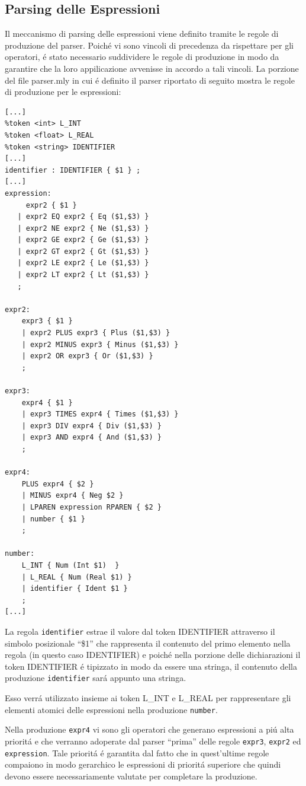 \documentclass[a4paper,10pt]{article}
\begin{document}
\subsection{Parsing delle Espressioni}
Il meccanismo di parsing delle espressioni viene definito tramite le regole di
produzione del parser. Poich\'e vi sono vincoli di precedenza da rispettare 
per gli operatori, \'e stato necessario suddividere le regole di produzione in
modo da garantire che la loro appilicazione avvenisse in accordo a tali
vincoli.
La porzione del file parser.mly in cui \'e definito il parser riportato di
 seguito mostra le regole di produzione per le espressioni:
\begin{verbatim}
[...]
%token <int> L_INT
%token <float> L_REAL
%token <string> IDENTIFIER
[...]
identifier : IDENTIFIER { $1 } ;
[...]
expression:
     expr2 { $1 }
   | expr2 EQ expr2 { Eq ($1,$3) }
   | expr2 NE expr2 { Ne ($1,$3) }
   | expr2 GE expr2 { Ge ($1,$3) }
   | expr2 GT expr2 { Gt ($1,$3) }
   | expr2 LE expr2 { Le ($1,$3) }
   | expr2 LT expr2 { Lt ($1,$3) }
   ;

expr2:
    expr3 { $1 }
    | expr2 PLUS expr3 { Plus ($1,$3) }
    | expr2 MINUS expr3 { Minus ($1,$3) }
    | expr2 OR expr3 { Or ($1,$3) }
    ;

expr3:
    expr4 { $1 }
    | expr3 TIMES expr4 { Times ($1,$3) }
    | expr3 DIV expr4 { Div ($1,$3) }
    | expr3 AND expr4 { And ($1,$3) }
    ;

expr4:
    PLUS expr4 { $2 }
    | MINUS expr4 { Neg $2 }
    | LPAREN expression RPAREN { $2 }
    | number { $1 }
    ;

number:
    L_INT { Num (Int $1)  }
    | L_REAL { Num (Real $1) }
    | identifier { Ident $1 }
    ;
[...]
\end{verbatim}
La regola \texttt{identifier} estrae il valore dal token IDENTIFIER attraverso
il simbolo posizionale ``\$1'' che rappresenta il contenuto del primo
elemento 
nella regola (in questo caso IDENTIFIER) e poich\'e nella porzione delle
dichiarazioni il token IDENTIFIER \'e tipizzato in modo da essere una stringa,
il contenuto della produzione \texttt{identifier} sar\'a appunto una stringa.

Esso verr\'a utilizzato insieme ai token L\_INT e L\_REAL per rappresentare gli
elementi atomici delle espressioni nella produzione \texttt{number}.

Nella produzione \texttt{expr4} vi sono gli operatori che generano espressioni 
a pi\'u alta priorit\'a e che verranno adoperate dal parser ``prima'' delle
regole \texttt{expr3}, \texttt{expr2} ed \texttt{expression}. Tale priorit\'a
\'e garantita dal fatto che in quest'ultime regole compaiono in modo
gerarchico le espressioni di priorit\'a superiore che quindi devono essere
necessariamente valutate per completare la produzione.
\end{document}
